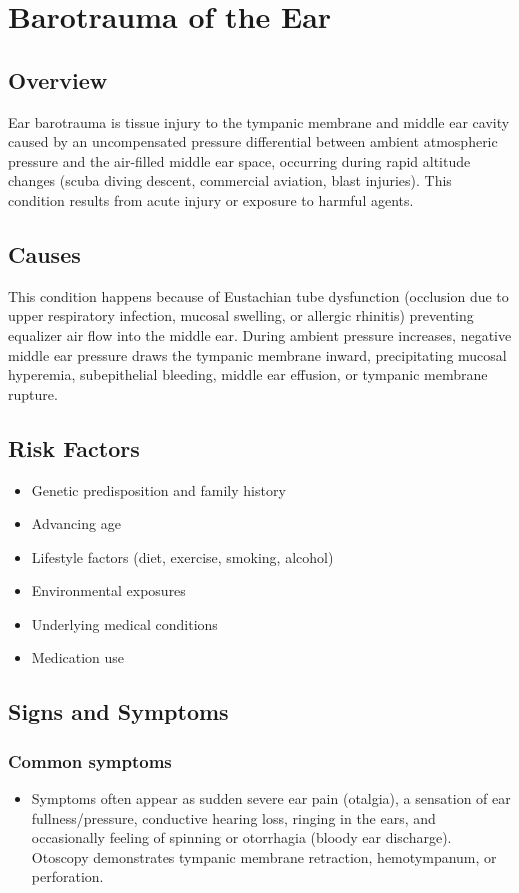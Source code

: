 \chapter{Barotrauma of the Ear}
\label{sec:Barotrauma of the Ear}

\section{Overview}
Ear barotrauma is tissue injury to the tympanic membrane and middle ear cavity caused by an uncompensated pressure differential between ambient atmospheric pressure and the air-filled middle ear space, occurring during rapid altitude changes (scuba diving descent, commercial aviation, blast injuries). This condition results from acute injury or exposure to harmful agents.
\section{Causes}
This condition happens because of Eustachian tube dysfunction (occlusion due to upper respiratory infection, mucosal swelling, or allergic rhinitis) preventing equalizer air flow into the middle ear. During ambient pressure increases, negative middle ear pressure draws the tympanic membrane inward, precipitating mucosal hyperemia, subepithelial bleeding, middle ear effusion, or tympanic membrane rupture.     
\section{Risk Factors}

\begin{itemize}[noitemsep]
  \item Genetic predisposition and family history
  \item Advancing age
  \item Lifestyle factors (diet, exercise, smoking, alcohol)
  \item Environmental exposures
  \item Underlying medical conditions
  \item Medication use
\end{itemize}
\section{Signs and Symptoms}

\subsection{Common symptoms}
\begin{itemize}[noitemsep]
  \item Symptoms often appear as sudden severe ear pain (otalgia), a sensation of ear fullness/pressure, conductive hearing loss, ringing in the ears, and occasionally feeling of spinning or otorrhagia (bloody ear discharge). Otoscopy demonstrates tympanic membrane retraction, hemotympanum, or perforation. 
  \end{itemize}

